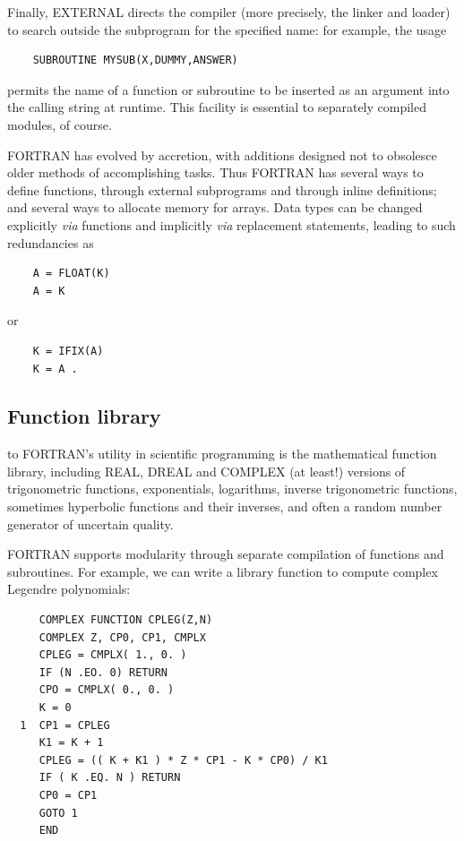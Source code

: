 Finally, EXTERNAL directs the compiler (more precisely, the linker and loader) to search outside the subprogram for the specified name: for example, the usage

\begin{verbatim}
    SUBROUTINE MYSUB(X,DUMMY,ANSWER)
\end{verbatim}

permits the name of a function or subroutine to be inserted as an argument into the calling string at runtime. This facility is essential to separately compiled modules, of course.

 FORTRAN has evolved by accretion, with additions designed not to obsolesce older methods of accomplishing tasks. Thus FORTRAN has several ways to define functions, through external subprograms and through inline definitions; and several ways to allocate memory for arrays. Data types can be changed explicitly \textit{via} functions and implicitly \textit{via} replacement statements, leading to such redundancies as

\begin{verbatim}
    A = FLOAT(K) 
    A = K
\end{verbatim}
or
\begin{verbatim}
    K = IFIX(A)
    K = A .
\end{verbatim}

\subsection{Function library}
 to FORTRAN's utility in scientific programming is the mathematical function library, including REAL, DREAL and COMPLEX (at least!) versions of trigonometric functions, exponentials, logarithms, inverse trigonometric functions, sometimes hyperbolic functions and their inverses, and often a random number generator of uncertain quality. 

FORTRAN supports modularity through separate compilation of functions and subroutines. For example, we can write a library function to compute complex Legendre polynomials:

\begin{verbatim} 
     COMPLEX FUNCTION CPLEG(Z,N)
     COMPLEX Z, CP0, CP1, CMPLX
     CPLEG = CMPLX( 1., 0. ) 
     IF (N .EO. 0) RETURN
     CPO = CMPLX( 0., 0. )
     K = 0
  1  CP1 = CPLEG
     K1 = K + 1
     CPLEG = (( K + K1 ) * Z * CP1 - K * CP0) / K1
     IF ( K .EQ. N ) RETURN 
     CP0 = CP1
     GOTO 1 
     END
\end{verbatim}

